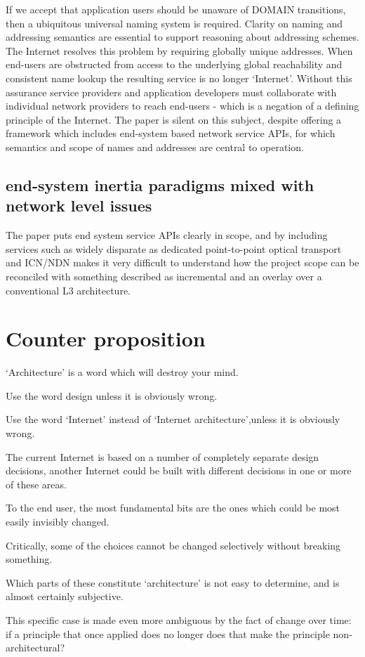 If we accept that application users should be unaware of DOMAIN transitions, then a ubiquitous universal naming system is required.
Clarity on naming and addressing semantics are essential to support reasoning about addressing schemes.
The Internet resolves this problem by requiring globally unique addresses.
When end-users are obstructed from access to the underlying global reachability and consistent name lookup the resulting service is no longer ‘Internet’.
Without this assurance service providers and application developers must collaborate with individual network providers to reach end-users - which is a negation of a defining principle of the Internet.
The paper is silent on this subject, despite offering a framework which includes end-system based network service APIs, for which semantics and scope of names and addresses are central to operation.

\subsection{end-system inertia paradigms mixed with network level issues}

The paper puts end system service APIs clearly in scope, and by including services such as widely disparate as dedicated point-to-point optical transport and ICN/NDN makes it very difficult to understand how the project scope can be reconciled with something described as incremental and an overlay over a conventional L3 architecture.

\section{Counter proposition}

\begin{myitemize}
    \item ‘Architecture’ is a word which will destroy your mind.
    \item Use the word design unless it is obviously wrong.
    \item Use the word ‘Internet’ instead of ‘Internet architecture’,unless it is obviously wrong.
    \item The current Internet is based on a number of completely separate design decisions, another Internet could be built with different decisions in one or more of these areas.
    \item To the end user, the most fundamental bits are the ones which could be most easily invisibly changed.
    \item Critically, some of the choices cannot be changed selectively without breaking something.
    \item Which parts of these constitute ‘architecture’ is not easy to determine, and is almost certainly subjective.
    \item This specific case is made even more ambiguous by the fact of change over time: if a principle that once applied does no longer does that make the principle non-architectural?
\end{myitemize}


